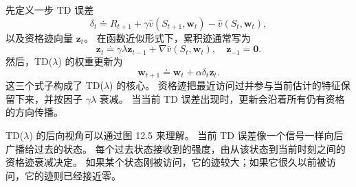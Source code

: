 \documentclass[UTF8, 12pt, fontset=fandol, oneside]{ctexart}
\begin{document}
先定义一步 TD 误差
\begin{equation}
\delta_t\doteq R_{t+1}+\gamma\hat v(S_{t+1},\mathbf{w}_t)-\hat v(S_t,\mathbf{w}_t),
\tag{12.5}
\end{equation}
以及资格迹向量 $\mathbf{z}_t$。
在函数近似形式下，累积迹通常写为
\begin{equation}
\mathbf{z}_t\doteq \gamma\lambda\mathbf{z}_{t-1}
+\nabla\hat v(S_t,\mathbf{w}_t),\quad \mathbf{z}_{-1}=\mathbf{0}.
\tag{12.6}
\end{equation}
然后，TD($\lambda$) 的权重更新为
\begin{equation}
\mathbf{w}_{t+1}\doteq \mathbf{w}_t+\alpha\delta_t\mathbf{z}_t.
\tag{12.7}
\end{equation}
这三个式子构成了 TD($\lambda$) 的核心。
资格迹把最近访问过并参与当前估计的特征保留下来，并按因子 $\gamma\lambda$ 衰减。
当当前 TD 误差出现时，更新会沿着所有仍有资格的方向传播。

\begin{center}
\end{center}

TD($\lambda$) 的后向视角可以通过图 12.5 来理解。
当前 TD 误差像一个信号一样向后广播给过去的状态。
每个过去状态接收到的强度，由从该状态到当前时刻之间的资格迹衰减决定。
如果某个状态刚被访问，它的迹较大；如果它很久以前被访问，它的迹则已经接近零。
\end{document}
